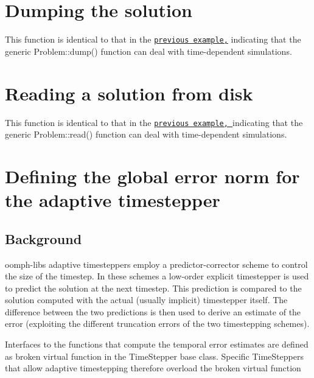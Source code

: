 

\hypertarget{index_dump}{}\section{Dumping the solution}\label{index_dump}
This function is identical to that in the \href{../../two_d_unsteady_heat2/html/index.html}{\tt previous example,} indicating that the generic {\ttfamily Problem\+::dump()} function can deal with time-\/dependent simulations.



 

\hypertarget{index_read}{}\section{Reading a solution from disk}\label{index_read}
This function is identical to that in the \href{../../two_d_unsteady_heat2/html/index.html}{\tt previous example, }indicating that the generic {\ttfamily Problem\+::read()} function can deal with time-\/dependent simulations.



 

\hypertarget{index_error}{}\section{Defining the global error norm for the adaptive timestepper}\label{index_error}
\hypertarget{index_back}{}\subsection{Background}\label{index_back}
{\ttfamily oomph-\/lib\textquotesingle{}s} adaptive timesteppers employ a predictor-\/corrector scheme to control the size of the timestep. In these schemes a low-\/order explicit timestepper is used to predict the solution at the next timestep. This prediction is compared to the solution computed with the actual (usually implicit) timestepper itself. The difference between the two predictions is then used to derive an estimate of the error (exploiting the different truncation errors of the two timestepping schemes).

Interfaces to the functions that compute the temporal error estimates are defined as broken virtual function in the {\ttfamily Time\+Stepper} base class. Specific {\ttfamily Time\+Steppers} that allow adaptive timestepping therefore overload the broken virtual function


